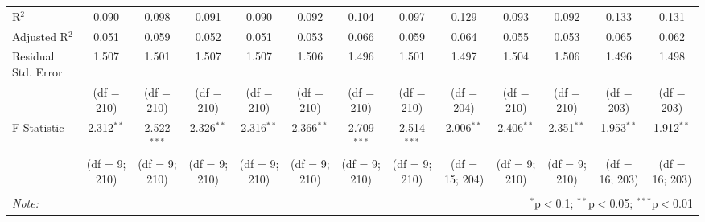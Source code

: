 \begin{subtables}
\begin{table}[H]
\begin{adjustbox}{width=\textwidth}
\begin{tabular}{@{\extracolsep{5pt}}lcccccccccccc}
R$^{2}$ & 0.090 & 0.098 & 0.091 & 0.090 & 0.092 & 0.104 & 0.097 & 0.129 & 0.093 & 0.092 & 0.133 & 0.131 \\ 
Adjusted R$^{2}$ & 0.051 & 0.059 & 0.052 & 0.051 & 0.053 & 0.066 & 0.059 & 0.064 & 0.055 & 0.053 & 0.065 & 0.062 \\ 
Residual Std. Error & 1.507  & 1.501  & 1.507  & 1.507  & 1.506  & 1.496  & 1.501  & 1.497  & 1.504  & 1.506  & 1.496 & 1.498  \\ 
& (df = 210) & (df = 210) & (df = 210) & (df = 210) & (df = 210) & (df = 210) & (df = 210) & (df = 204) & (df = 210) & (df = 210) & (df = 203) & (df = 203) \\
F Statistic & 2.312$^{**}$  & 2.522$^{***}$  & 2.326$^{**}$ & 2.316$^{**}$  & 2.366$^{**}$ & 2.709$^{***}$  & 2.514$^{***}$  & 2.006$^{**}$  & 2.406$^{**}$  & 2.351$^{**}$  & 1.953$^{**}$  & 1.912$^{**}$  \\ 
& (df = 9; 210) & (df = 9; 210) & (df = 9; 210) & (df = 9; 210) & (df = 9; 210) & (df = 9; 210) & (df = 9; 210) & (df = 15; 204) & (df = 9; 210) & (df = 9; 210) & (df = 16; 203) & (df = 16; 203) \\
\hline 
\hline \\[-1.8ex] 
\textit{Note:}  & \multicolumn{12}{r}{$^{*}$p$<$0.1; $^{**}$p$<$0.05; $^{***}$p$<$0.01} \\ 
\end{tabular} 
\end{adjustbox}
\end{table} 

\newpage


\end{subtables}
